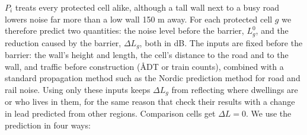 \documentclass[11pt]{article}
\begin{document}
\(P_i\) treats every protected cell alike, although a tall wall next to a busy road lowers noise far more than a low wall 150 m away. For each protected cell \(g\) we therefore predict two quantities: the noise level before the barrier, \(L^0_g\), and the reduction caused by the barrier, \(\Delta L_g\), both in dB. The inputs are fixed before the barrier: the wall's height and length, the cell's distance to the road and to the wall, and traffic before construction (ÅDT or train counts), combined with a standard propagation method such as the Nordic prediction method for road and rail noise. Using only these inputs keeps \(\Delta L_g\) from reflecting where dwellings are or who lives in them, for the same reason that \textcite{gronqvistUnderstandingHowLow2020} check their results with a change in lead predicted from other regions. Comparison cells get \(\Delta L = 0\). We use the prediction in four ways:
\end{document}
